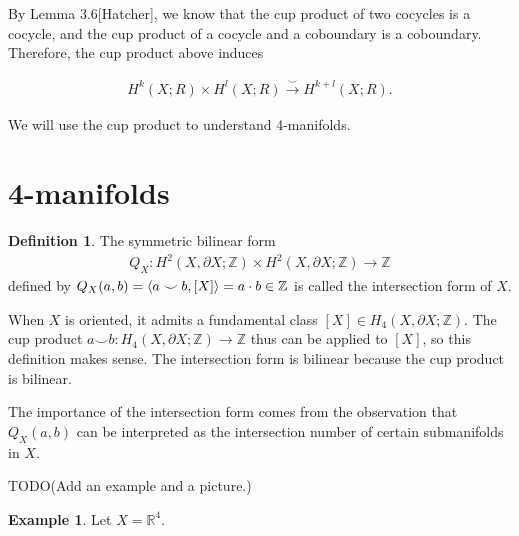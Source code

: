 \documentclass[11pt, psamsfonts]{amsart}
\theoremstyle{definition}
\newtheorem{defn}[thm]{Definition}
\newtheorem{exmp}[thm]{Example}
\theoremstyle{remark}
\numberwithin{equation}{section}
\begin{document}
By Lemma 3.6[Hatcher], we know that the cup product of two cocycles is a cocycle, and the cup product of a cocycle and a coboundary is a coboundary.
Therefore, the cup product above induces

\begin{align*}
  H^k(X; R) \times H^l(X; R) \xrightarrow{\smile} H^{k + l}(X; R).
\end{align*}

We will use the cup product to understand 4-manifolds.

\section{4-manifolds}

\begin{defn}
  The symmetric bilinear form
  \begin{align*}
    Q_X:H^2(X, \partial X; \mathbb{Z}) \times H^2(X, \partial X; \mathbb{Z}) \rightarrow \mathbb{Z}
  \end{align*}
  defined by $Q_X(a, b) = \ev{a \smile b, [X]} = a \cdot b \in \mathbb{Z}$ is called the intersection form of $X$.
\end{defn}

When $X$ is oriented, it admits a fundamental class $[X] \in H_4(X, \partial X; \mathbb{Z})$.
The cup product $a \smile b: H_4(X, \partial X; \mathbb{Z}) \rightarrow \mathbb{Z}$ thus can be applied to $[X]$, so this definition makes sense.
The intersection form is bilinear because the cup product is bilinear.

The importance of the intersection form comes from the observation that $Q_X(a, b)$ can be interpreted as the intersection number of certain submanifolds in $X$.

TODO(Add an example and a picture.)

\begin{exmp}
  Let $X = \mathbb{R}^4$.
\end{exmp}
\end{document}
